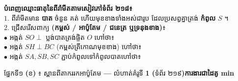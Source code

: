 \documentclass[a4paper,10pt]{article}
\newcommand{\en}[1]{{\TimesEn #1}}
\newcommand{\enbf}[1]{{\TimesEn\textbf{#1}}}
\newcommand{\blank}[1]{\makebox[#1]{\dotfill}}
\newcommand{\secbar}[2]{%
  \vspace{3pt}%
  \begin{tcolorbox}[
    enhanced, sharp corners, colback=headgray, colframe=black,
    boxrule=0.9pt, boxsep=1pt, top=2.5pt, bottom=2.5pt, left=6pt, right=6pt,
    after skip=3pt
  ]
    {\muol\fontsize{9.2pt}{13.5pt}\selectfont #1}\hfill{\fontsize{8.3pt}{11.5pt}\selectfont\textbf{#2}}
  \end{tcolorbox}%
}
\begin{document}
\begin{minipage}[c]{9.6cm}\raggedright
  \textbf{បំពេញឈ្មោះធាតុនៃពីរ៉ាមីតតាមសៀវភៅទំព័រ ២១៨៖}\\[6.5pt]
  $1.$ ពីរ៉ាមីតមាន \textbf{បាត} ចំនួន \blank{0.9cm} គត់ ហើយមុខខាងទាំងអស់ជារូប \blank{2.3cm} ដែលប្រសព្វគ្នាត្រង់ \textbf{កំពូល} $S$ ។\\[6pt]
  $2.$ ជ្រើសរើសពាក្យ \textbf{(កម្ពស់ / អាប៉ូតែម / ជនេត្រ ឬទ្រនុងខាង)}៖\\[4pt]
  \hspace*{0.2cm}$\bullet$ អង្កត់ $SO\perp$ ប្លង់បាតត្រង់ផ្ចិត $O$ ហៅថា៖ \textbf{\blank{2.6cm}}\\[4.5pt]
  \hspace*{0.2cm}$\bullet$ អង្កត់ $SH\perp BC$ (កម្ពស់ត្រីកោណមុខខាង) ហៅថា៖ \textbf{\blank{2.5cm}}\\[4.5pt]
  \hspace*{0.2cm}$\bullet$ អង្កត់ $SA, SB, SC$ ភ្ជាប់កំពូលទៅកំពូលបាតហៅថា៖ \textbf{\blank{2.4cm}}
\end{minipage}

\vspace{14pt}
\secbar{ផ្នែកទី១ \enbf{(}ខ\enbf{)} ៖ ស្ពានពីតាកររកអាប៉ូតែម \enbf{---} លំហាត់គំរូទី \enbf{1 (}ទំព័រ ២១៩\enbf{)}}{ការងារជាដៃគូ \en{6 min}}
\end{document}

